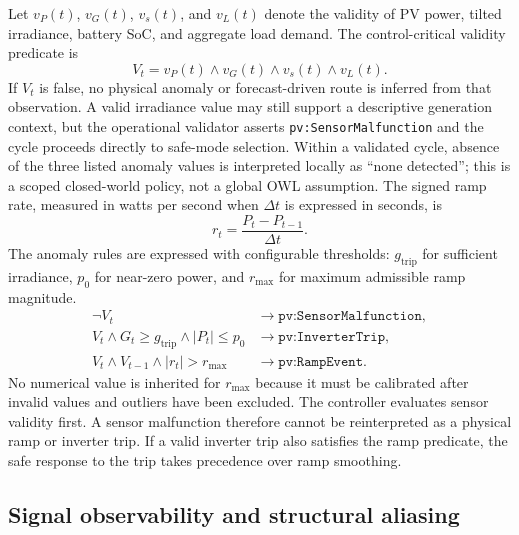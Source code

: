 \documentclass[
	letterpaper,
	10pt,
	unnumberedsections,
	twoside,
]{LTJournalArticle}
\newcommand{\valueof}[1]{\texttt{pv:#1}}
\begin{document}
Let $v_P(t)$, $v_G(t)$, $v_s(t)$, and $v_L(t)$ denote the validity of PV power, tilted irradiance, battery SoC, and aggregate load demand. The control-critical validity predicate is
\begin{equation}
\label{eq:validity}
V_t=v_P(t)\wedge v_G(t)\wedge v_s(t)\wedge v_L(t).
\end{equation}
If $V_t$ is false, no physical anomaly or forecast-driven route is inferred from that observation. A valid irradiance value may still support a descriptive generation context, but the operational validator asserts \valueof{SensorMalfunction} and the cycle proceeds directly to safe-mode selection. Within a validated cycle, absence of the three listed anomaly values is interpreted locally as ``none detected''; this is a scoped closed-world policy, not a global OWL assumption.
The signed ramp rate, measured in watts per second when $\Delta t$ is expressed in seconds, is
\begin{equation}
\label{eq:signed-ramp}
r_t=\frac{P_t-P_{t-1}}{\Delta t}.
\end{equation}
The anomaly rules are expressed with configurable thresholds: $g_{\mathrm{trip}}$ for sufficient irradiance, $p_0$ for near-zero power, and $r_{\max}$ for maximum admissible ramp magnitude.
\begin{align}
\neg V_t
&\longrightarrow \valueof{SensorMalfunction},
\label{eq:sensor-malfunction}\\
V_t\wedge G_t\geq g_{\mathrm{trip}}
\wedge |P_t|\leq p_0
&\longrightarrow \valueof{InverterTrip},
\label{eq:inverter-trip}\\
V_t\wedge V_{t-1}\wedge |r_t|>r_{\max}
&\longrightarrow \valueof{RampEvent}.
\label{eq:ramp-event}
\end{align}
No numerical value is inherited for $r_{\max}$ because it must be calibrated after invalid values and outliers have been excluded. The controller evaluates sensor validity first. A sensor malfunction therefore cannot be reinterpreted as a physical ramp or inverter trip. If a valid inverter trip also satisfies the ramp predicate, the safe response to the trip takes precedence over ramp smoothing.

\subsection{Signal observability and structural aliasing}
\end{document}
